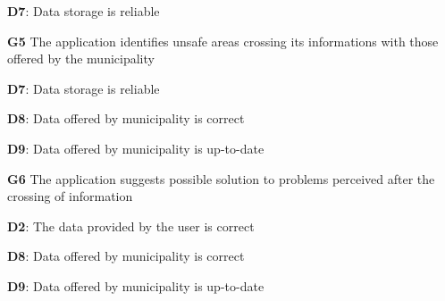 \begin{outline}
\2 \textbf{D7}: Data storage is reliable


\1  \textbf{G5} The application identifies unsafe areas crossing its informations with those offered by the municipality

\2 \textbf{D7}: Data storage is reliable

\2 \textbf{D8}: Data offered by municipality is correct

\2 \textbf{D9}: Data offered by municipality is up-to-date



\1  \textbf{G6} The application suggests possible solution to problems perceived after the crossing of information

\2 \textbf{D2}: The data provided by the user is correct

\2 \textbf{D8}: Data offered by municipality is correct

\2 \textbf{D9}: Data offered by municipality is up-to-date

\end{outline}